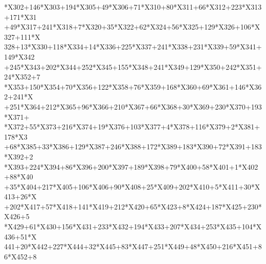 \begin{tabbing}
\>*X302+146*X303+194*X305+49*X306+71*X310+80*X311+66*X312+223*X313+171*X31\\[0pt]
+49*X317+241*X318+7*X320+35*X322+62*X324+56*X325+129*X326+106*X327+111*X\\[0pt]
\>328+13*X330+118*X334+14*X336+225*X337+241*X338+231*X339+59*X341+149*X342\\[0pt]
\>+245*X343+202*X344+252*X345+155*X348+241*X349+129*X350+242*X351+24*X352+7\\[0pt]
*X353+150*X354+70*X356+122*X358+76*X359+168*X360+69*X361+146*X362+241*X\\[0pt]
+251*X364+212*X365+96*X366+210*X367+66*X368+30*X369+230*X370+193*X371+\\[0pt]
*X372+55*X373+216*X374+19*X376+103*X377+4*X378+116*X379+2*X381+178*X3\\[0pt]
+68*X385+33*X386+129*X387+246*X388+172*X389+183*X390+72*X391+183*X392+2\\[0pt]
*X393+224*X394+86*X396+200*X397+189*X398+79*X400+58*X401+1*X402+88*X40\\[0pt]
+35*X404+217*X405+106*X406+90*X408+25*X409+202*X410+5*X411+30*X413+26*X\\[0pt]
+202*X417+57*X418+141*X419+212*X420+65*X423+8*X424+187*X425+230*X426+5\\[0pt]
*X429+61*X430+156*X431+233*X432+194*X433+207*X434+253*X435+104*X436+51*X\\[0pt]
\>441+20*X442+227*X444+32*X445+83*X447+251*X449+48*X450+216*X451+86*X452+8\\[0pt]

\end{tabbing}
